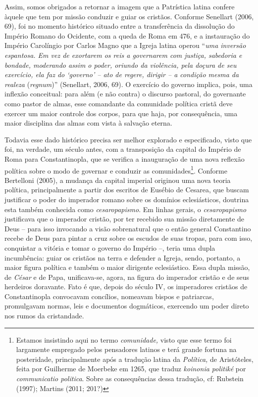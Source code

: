 Assim, somos obrigados a retornar a imagem que a Patrística latina
confere àquele que tem por missão conduzir e guiar os cristãos. Conforme
Senellart (2006, 69), foi no momento histórico situado entre a
transferência da dissolução do Império Romano do Ocidente, com a queda
de Roma em 476, e a instauração do Império Carolíngio por Carlos Magno
que a Igreja latina operou ``\emph{uma inversão espantosa. Em vez de
exortarem os reis a governarem com justiça, sabedoria e bondade,
moderando assim o poder, oriundo da violência, pela doçura de seu
exercício, ela faz do `governo' -- ato de regere, dirigir -- a condição
mesma da realeza} (\emph{regnum})'' (Senellart, 2006, 69). O exercício
do governo implica, pois, uma inflexão conceitual: para além (e não
contra) o discurso pastoral, do governante como pastor de almas, esse
comandante da comunidade política cristã deve exercer um maior controle
dos corpos, para que haja, por consequência, uma maior disciplina das
almas com vista à salvação eterna.

Todavia esse dado histórico precisa ser melhor explorado e especificado,
visto que foi, na verdade, um século antes, com a transposição da
capital do Império de Roma para Constantinopla, que se verifica a
inauguração de uma nova reflexão política sobre o modo de governar e
conduzir as comunidades\footnote{Estamos insistindo aqui no termo
  \emph{comunidade,} visto que esse termo foi largamente empregado pelos
  pensadores latinos e terá grande fortuna na posteridade,
  principalmente após a tradução latina da \emph{Política,} de
  Aristóteles, feita por Guilherme de Moerbeke em 1265, que traduz
  \emph{koinonia politiké} por \emph{communicatio politica}. Sobre as
  consequências dessa tradução, cf: Rubstein (1997); Martins (2011;
  201?)}. Conforme Bertelloni (2005), a mudança da capital imperial
originou uma nova teoria política, principalmente a partir dos escritos
de Eusébio de Cesarea, que buscam justificar o poder do imperador romano
sobre os domínios eclesiásticos, doutrina esta também conhecida como
\emph{cesaropapismo}. Em linhas gerais, o \emph{cesaropapismo}
justificava que o imperador cristão, por ter recebido sua missão
diretamente de Deus -- para isso invocando a visão sobrenatural que o
então general Constantino recebe de Deus para pintar a cruz sobre os
escudos de suas tropas, para com isso, conquistar a vitória e tomar o
governo do Império --, teria uma dupla incumbência: guiar os cristãos na
terra e defender a Igreja, sendo, portanto, a maior figura política e
também o maior dirigente eclesiástico. Essa dupla missão, de
\emph{César} e de Papa, unificava-se, agora, na figura do imperador
cristão e de seus herdeiros doravante. Fato é que, depois do século IV,
os imperadores cristãos de Constantinopla convocavam concílios, nomeavam
bispos e patriarcas, promulgavam normas, leis e documentos dogmáticos,
exercendo um poder direto nos rumos da cristandade.

